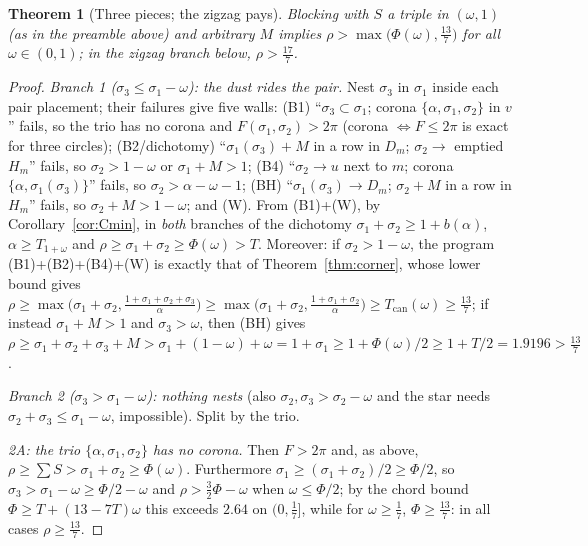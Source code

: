 \documentclass[11pt]{article}
\newtheorem{theorem}{Theorem}
\theoremstyle{definition}
\begin{document}
\begin{theorem}[Three pieces; the zigzag pays]\label{thm:DT3}
Blocking with $S$ a triple in $(\omega,1)$ (as in the preamble above) and
arbitrary $M$ implies
$\rho>\max\bigl(\Phi(\omega),\tfrac{13}7\bigr)$ for all
$\omega\in(0,1)$; in the zigzag branch below, $\rho>\tfrac{17}7$.
\end{theorem}
\begin{proof}
\emph{Branch 1 ($\sigma_3\le\sigma_1-\omega$): the dust rides the pair.}
Nest $\sigma_3$ in $\sigma_1$ inside each pair placement; their failures
give five walls: (B1) ``$\sigma_3\subset\sigma_1$; corona
$\{\alpha,\sigma_1,\sigma_2\}$ in $v$'' fails, so the trio has no corona
and $F(\sigma_1,\sigma_2)>2\pi$ (corona $\iff F\le2\pi$ is exact for
three circles); (B2/dichotomy) ``$\sigma_1(\sigma_3)+M$ in a row in
$D_m$; $\sigma_2\to$ emptied $H_m$'' fails, so $\sigma_2>1-\omega$ or
$\sigma_1+M>1$; (B4) ``$\sigma_2\to u$ next to $m$; corona
$\{\alpha,\sigma_1(\sigma_3)\}$'' fails, so $\sigma_2>\alpha-\omega-1$;
(BH) ``$\sigma_1(\sigma_3)\to D_m$; $\sigma_2+M$ in a row in $H_m$''
fails, so $\sigma_2+M>1-\omega$; and (W). From (B1)+(W), by
Corollary~\ref{cor:Cmin}, in \emph{both} branches of the dichotomy
$\sigma_1+\sigma_2\ge1+b(\alpha)$, $\alpha\ge T_{1+\omega}$ and
$\rho\ge\sigma_1+\sigma_2\ge\Phi(\omega)>T$. Moreover: if
$\sigma_2>1-\omega$, the program (B1)+(B2)+(B4)+(W) is exactly that of
Theorem~\ref{thm:corner}, whose lower bound gives
$\rho\ge\max\bigl(\sigma_1+\sigma_2,
\tfrac{1+\sigma_1+\sigma_2+\sigma_3}{\alpha}\bigr)
\ge\max\bigl(\sigma_1+\sigma_2,\tfrac{1+\sigma_1+\sigma_2}{\alpha}\bigr)
\ge T_{\mathrm{can}}(\omega)\ge\tfrac{13}7$; if instead $\sigma_1+M>1$ and $\sigma_3>\omega$, then (BH) gives
$\rho\ge\sigma_1+\sigma_2+\sigma_3+M>\sigma_1+(1-\omega)+\omega
=1+\sigma_1\ge1+\Phi(\omega)/2\ge1+T/2=1.9196>\tfrac{13}7$.

\emph{Branch 2 ($\sigma_3>\sigma_1-\omega$): nothing nests} (also
$\sigma_2,\sigma_3>\sigma_2-\omega$ and the star needs
$\sigma_2+\sigma_3\le\sigma_1-\omega$, impossible). Split by the trio.

\emph{2A: the trio $\{\alpha,\sigma_1,\sigma_2\}$ has no corona.} Then
$F>2\pi$ and, as above, $\rho\ge\sum S>\sigma_1+\sigma_2\ge\Phi(\omega)$.
Furthermore $\sigma_1\ge(\sigma_1+\sigma_2)/2\ge\Phi/2$, so
$\sigma_3>\sigma_1-\omega\ge\Phi/2-\omega$ and
$\rho>\tfrac32\Phi-\omega$ when $\omega\le\Phi/2$; by the chord bound
$\Phi\ge T+(13-7T)\omega$ this exceeds $2.64$ on $(0,\tfrac17]$, while
for $\omega\ge\tfrac17$, $\Phi\ge\tfrac{13}7$: in all cases
$\rho\ge\tfrac{13}7$.


\end{proof}
\end{document}
